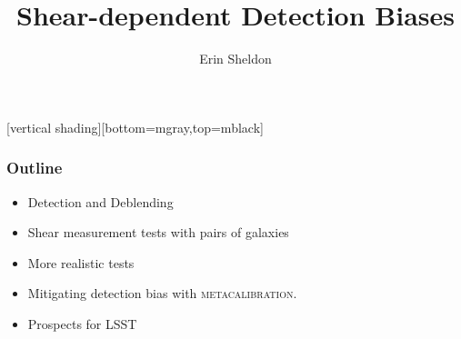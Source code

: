 \documentclass{beamer}
\title{Shear-dependent Detection Biases}
\author{Erin Sheldon}
\institute{Brookhaven National Laboratory}
\newcommand{\mcal}{\textsc{metacalibration}}
\begin{document}
\frame
{
}




\frame{\titlepage}

[vertical shading][bottom=mgray,top=mblack]





\frame
{
    \frametitle{Outline}

    \begin{itemize}

        \item Detection and Deblending
        \item Shear measurement tests with pairs of galaxies
        \item More realistic tests
        \item Mitigating detection bias with \mcal.
        \item Prospects for LSST

    \end{itemize}

}
\end{document}
